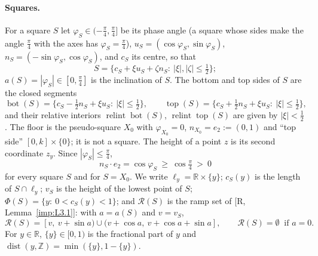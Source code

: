 \documentclass[11pt]{amsart}
\newcommand{\R}{\mathbb R}
\newcommand{\Z}{\mathbb Z}
\newcommand{\cR}{\mathcal R}
\newcommand{\relint}{\operatorname{relint}}
\newcommand{\Bot}{\operatorname{bot}}
\newcommand{\Top}{\operatorname{top}}
\newcommand{\dist}{\operatorname{dist}}
\newcommand{\frc}[1]{\{#1\}}
\theoremstyle{definition}
\theoremstyle{remark}
\numberwithin{equation}{section}
\begin{document}
\paragraph{Squares.}
For a square $S$ let $\varphi_S\in(-\frac\pi4,\frac\pi4]$ be its phase angle (a square whose sides make the angle $\frac\pi4$ with the axes has $\varphi_S=\frac\pi4$), $u_S=(\cos\varphi_S,\sin\varphi_S)$, $n_S=(-\sin\varphi_S,\cos\varphi_S)$, and $c_S$ its centre, so that
\[
S=\{c_S+\xi u_S+\zeta n_S:\ |\xi|,|\zeta|\le\tfrac12\};
\]
$a(S)=|\varphi_S|\in[0,\frac\pi4]$ is the inclination of $S$. The bottom and top sides of $S$ are the closed segments
\[
\Bot(S)=\{c_S-\tfrac12n_S+\xi u_S:\ |\xi|\le\tfrac12\},\qquad
\Top(S)=\{c_S+\tfrac12n_S+\xi u_S:\ |\xi|\le\tfrac12\},
\]
and their relative interiors $\relint\Bot(S)$, $\relint\Top(S)$ are given by $|\xi|<\frac12$. The floor is the pseudo-square $X_0$ with $\varphi_{X_0}=0$, $n_{X_0}=e_2:=(0,1)$ and ``top side'' $[0,k]\times\{0\}$; it is not a square. The height of a point $z$ is its second coordinate $z_y$. Since $|\varphi_S|\le\frac\pi4$,
\begin{equation}\label{eq:P12-ny}
n_S\cdot e_2=\cos\varphi_S\ \ge\ \cos\tfrac\pi4\ >\ 0
\end{equation}
for every square $S$ and for $S=X_0$. We write $\ell_y=\R\times\{y\}$; $c_S(y)$ is the length of $S\cap\ell_y$; $v_S$ is the height of the lowest point of $S$; $\Phi(S)=\{y:\ 0<c_S(y)<1\}$; and $\cR(S)$ is the ramp set of [R, Lemma~\ref{imp:L3.1}]: with $a=a(S)$ and $v=v_S$,
\[
\cR(S)=[v,\ v+\sin a)\cup(v+\cos a,\ v+\cos a+\sin a],\qquad \cR(S)=\emptyset\ \text{ if } a=0 .
\]
For $y\in\R$, $\frc{y}\in[0,1)$ is the fractional part of $y$ and $\dist(y,\Z)=\min(\frc{y},1-\frc{y})$.
\end{document}
